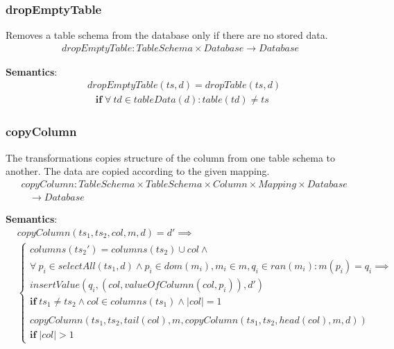 \documentclass[10pt]{article}
\begin{document}
\subsubsection{dropEmptyTable}
Removes a table schema from the database only if there are no stored data.
\begin{align}
dropEmptyTable:  TableSchema \times Database \rightarrow Database
\end{align}

\noindent \textbf{Semantics}:
\begin{align}
& dropEmptyTable(ts, d) = dropTable(ts, d) \nonumber \\
& \;\;\; \mathbf{if} \; \forall \: td \in tableData(d) : table(td) \neq ts
\end{align}


\subsubsection{copyColumn}
The transformations copies structure of the column from one table schema to another. The data are copied according to the given mapping.
\begin{align}
& copyColumn: TableSchema \times TableSchema \times Column \times Mapping \times Database   \nonumber \\
& \;\;\; \rightarrow Database
\end{align}

\noindent \textbf{Semantics}:
\begin{align}
& copyColumn(ts_1, ts_2, col, m, d) = d' \implies \\ 
& \begin{cases}
 columns(ts_2') = columns(ts_2) \cup col \land \nonumber \\
     \forall \: p_i \in selectAll(ts_1, d) \land p_i \in dom(m_i), m_i \in m, q_{i} \in ran(m_i) : m(p_i) = q_i \implies \nonumber \\
  insertValue(q_i, (col, valueOfColumn(col, p_i)), d')  \nonumber \\
 \mathbf{if} \; ts_1 \neq ts_2 \land col \in columns(ts_1) \land |col| = 1
 \\\\
 copyColumn(ts_1, ts_2, tail(col), m, copyColumn(ts_1, ts_2, head(col), m, d))\\
 \mathbf{if} \; |col| > 1
 \end{cases}
\end{align}
\end{document}
